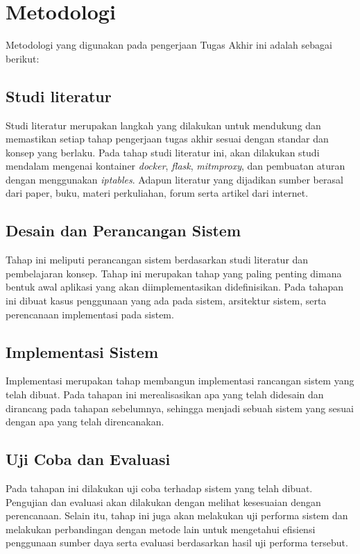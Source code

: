 \section{Metodologi}
Metodologi yang digunakan pada pengerjaan Tugas Akhir ini
adalah sebagai berikut:
\subsection{Studi literatur}
Studi literatur merupakan langkah yang dilakukan untuk mendukung dan memastikan setiap tahap pengerjaan tugas akhir sesuai dengan standar dan konsep yang berlaku. Pada tahap studi literatur ini, akan dilakukan studi mendalam mengenai kontainer \textit{docker}, \textit{flask}, \textit{mitmproxy}, dan pembuatan aturan dengan menggunakan \textit{iptables}. Adapun literatur yang dijadikan sumber berasal dari paper, buku, materi perkuliahan, forum serta artikel dari internet.

\subsection{Desain dan Perancangan Sistem}
Tahap ini meliputi perancangan sistem berdasarkan studi literatur dan pembelajaran konsep. Tahap ini merupakan tahap yang paling penting dimana bentuk awal aplikasi yang akan diimplementasikan didefinisikan. Pada tahapan ini dibuat kasus penggunaan yang ada pada sistem, arsitektur sistem, serta perencanaan implementasi pada sistem.
\subsection{Implementasi Sistem}
Implementasi merupakan tahap membangun implementasi rancangan sistem yang telah dibuat. Pada tahapan ini merealisasikan apa yang telah didesain dan dirancang pada tahapan sebelumnya, sehingga menjadi sebuah sistem yang sesuai dengan apa yang telah direncanakan.
\subsection{Uji Coba dan Evaluasi}
Pada tahapan ini dilakukan uji coba terhadap sistem yang telah dibuat. Pengujian dan evaluasi akan dilakukan dengan melihat kesesuaian dengan perencanaan. Selain itu, tahap ini juga akan melakukan uji performa sistem dan melakukan perbandingan dengan metode lain untuk mengetahui efisiensi penggunaan sumber daya serta evaluasi berdasarkan hasil uji performa tersebut. 

